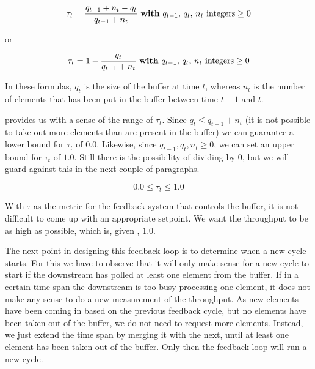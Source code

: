 \begin{equation}\label{eq:throughput-fraction}
\tau_t = \frac{q_{t-1} + n_t - q_t }{q_{t-1} + n_t} \text{ \textbf{with} }q_{t-1}\text{, }q_t\text{, }n_t\text{ integers} \geq 0
\end{equation}

or

\begin{equation}\label{eq:throughput-simple}
\tau_t = 1 - \frac{q_t}{q_{t-1} + n_t} \text{ \textbf{with} }q_{t-1}\text{, }q_t\text{, }n_t\text{ integers} \geq 0
\end{equation}

In these formulas, $q_t$ is the size of the buffer at time $t$, whereas $n_t$ is the number of elements that has been put in the buffer between time $t - 1$ and $t$.

 provides us with a sense of the range of $\tau_t$. Since $q_t \leq q_{t-1} + n_t$ (it is not possible to take out more elements than are present in the buffer) we can guarantee a lower bound for $\tau_t$ of $0.0$. Likewise, since $q_{t-1}, q_t, n_t \geq 0$, we can set an upper bound for $\tau_t$ of $1.0$. Still there is the possibility of dividing by 0, but we will guard against this in the next couple of paragraphs.

\begin{equation}\label{eq:range-of-tau}
0.0 \leq \tau_t \leq 1.0
\end{equation}

With $\tau$ as the metric for the feedback system that controls the buffer, it is not difficult to come up with an appropriate setpoint. We want the throughput to be as high as possible, which is, given , $1.0$.

The next point in designing this feedback loop is to determine when a new cycle starts. For this we have to observe that it will only make sense for a new cycle to start if the downstream has polled at least one element from the buffer. If in a certain time span the downstream is too busy processing one element, it does not make any sense to do a new measurement of the throughput. As new elements have been coming in based on the previous feedback cycle, but no elements have been taken out of the buffer, we do not need to request more elements. Instead, we just extend the time span by merging it with the next, until at least one element has been taken out of the buffer. Only then the feedback loop will run a new cycle.

